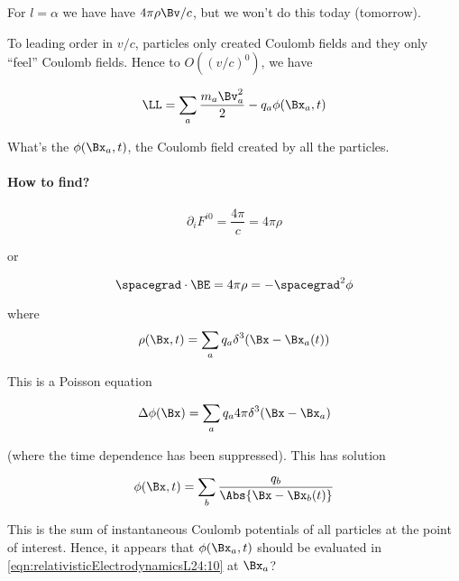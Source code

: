 For $l = \alpha$ we have have $4 \pi \rho \Bv/c$, but we won't do this today (tomorrow).

To leading order in $v/c$, particles only created Coulomb fields and they only ``feel'' Coulomb fields.  Hence to $O((v/c)^0)$, we have 

\begin{equation}\label{eqn:relativisticElectrodynamicsL24:150}
\LL = \sum_a \frac{m_a \Bv_a^2}{2} - q_a \phi(\Bx_a, t)
\end{equation}

What's the $\phi(\Bx_a, t)$, the Coulomb field created by all the particles.

\paragraph{How to find?}

\begin{equation}\label{eqn:relativisticElectrodynamicsL24:170}
\partial_i F^{i 0} = \frac{4 \pi}{c} = 4 \pi \rho
\end{equation}

or

\begin{equation}\label{eqn:relativisticElectrodynamicsL24:190}
\spacegrad \cdot \BE = 4 \pi \rho = - \spacegrad^2 \phi 
\end{equation}

where
\begin{equation}\label{eqn:relativisticElectrodynamicsL24:210}
\rho(\Bx, t) = \sum_a q_a \delta^3 (\Bx - \Bx_a(t))
\end{equation}

This is a Poisson equation

\begin{equation}\label{eqn:relativisticElectrodynamicsL24:230}
\Delta \phi(\Bx) = \sum_a q_a 4 \pi \delta^3(\Bx - \Bx_a)
\end{equation}

(where the time dependence has been suppressed).  This has solution 

\begin{equation}\label{eqn:relativisticElectrodynamicsL24:10}
\phi(\Bx, t) = \sum_b \frac{q_b}{\Abs{\Bx - \Bx_b(t)}}
\end{equation}

This is the sum of instantaneous Coulomb potentials of all particles at the point of interest.  Hence, it appears that $\phi(\Bx_a, t)$ should be evaluated in \ref{eqn:relativisticElectrodynamicsL24:10} at $\Bx_a$?

